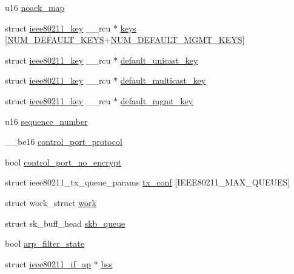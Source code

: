 \begin{DoxyCompactItemize}
\item 
u16 \hyperlink{structieee80211__sub__if__data_a151051cbbca12c85e61578f27ae99ced}{noack\-\_\-map}
\item 
struct \hyperlink{structieee80211__key}{ieee80211\-\_\-key} \-\_\-\-\_\-rcu $\ast$ \hyperlink{structieee80211__sub__if__data_ad9d8249bd02068d887fd83a256bd0549}{keys} \mbox{[}\hyperlink{key_8h_afc56a6aebd37a90bca92708898c4e80a}{N\-U\-M\-\_\-\-D\-E\-F\-A\-U\-L\-T\-\_\-\-K\-E\-Y\-S}+\hyperlink{key_8h_a7cb10042c995311e0b4dfa6a8cabdd11}{N\-U\-M\-\_\-\-D\-E\-F\-A\-U\-L\-T\-\_\-\-M\-G\-M\-T\-\_\-\-K\-E\-Y\-S}\mbox{]}
\item 
struct \hyperlink{structieee80211__key}{ieee80211\-\_\-key} \-\_\-\-\_\-rcu $\ast$ \hyperlink{structieee80211__sub__if__data_a44b1d9794b9cb6b73af38c8c6258cfcf}{default\-\_\-unicast\-\_\-key}
\item 
struct \hyperlink{structieee80211__key}{ieee80211\-\_\-key} \-\_\-\-\_\-rcu $\ast$ \hyperlink{structieee80211__sub__if__data_a3b14deb6e926750564314ff8a32147ba}{default\-\_\-multicast\-\_\-key}
\item 
struct \hyperlink{structieee80211__key}{ieee80211\-\_\-key} \-\_\-\-\_\-rcu $\ast$ \hyperlink{structieee80211__sub__if__data_a2919f5df0fee1d8bbeac082c448c77c3}{default\-\_\-mgmt\-\_\-key}
\item 
u16 \hyperlink{structieee80211__sub__if__data_ac171f7c2d4f67742e044f800ce3ca592}{sequence\-\_\-number}
\item 
\-\_\-\-\_\-be16 \hyperlink{structieee80211__sub__if__data_a9d1f464ce348d7d7e6852ac8e32e0d0f}{control\-\_\-port\-\_\-protocol}
\item 
bool \hyperlink{structieee80211__sub__if__data_a5ac2427ee669706bf98a29fc82ed9666}{control\-\_\-port\-\_\-no\-\_\-encrypt}
\item 
struct ieee80211\-\_\-tx\-\_\-queue\-\_\-params \hyperlink{structieee80211__sub__if__data_aa80252c8fcedef0fef3d580c68867c84}{tx\-\_\-conf} \mbox{[}I\-E\-E\-E80211\-\_\-\-M\-A\-X\-\_\-\-Q\-U\-E\-U\-E\-S\mbox{]}
\item 
struct work\-\_\-struct \hyperlink{structieee80211__sub__if__data_a623997e11b94d7c467ce26627cc488a2}{work}
\item 
struct sk\-\_\-buff\-\_\-head \hyperlink{structieee80211__sub__if__data_a6eeb93345e21d69a77a7c2c571bd0000}{skb\-\_\-queue}
\item 
bool \hyperlink{structieee80211__sub__if__data_a0216068b0f336a8922737d055a92e4cd}{arp\-\_\-filter\-\_\-state}
\item 
struct \hyperlink{structieee80211__if__ap}{ieee80211\-\_\-if\-\_\-ap} $\ast$ \hyperlink{structieee80211__sub__if__data_a45b3472e16d1f1a8c58e64b338d4e946}{bss}

\end{DoxyCompactItemize}
